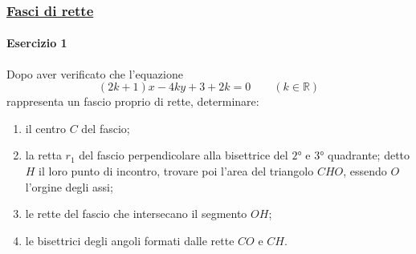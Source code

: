 \subsubsection*{\hyperref[subsec:geomanal:fasciorette]{Fasci di rette}}
\paragraph{Esercizio 1}
Dopo aver verificato che l'equazione
\begin{equation*}
  (2k+1)x -4ky + 3 + 2k = 0 \qquad (k\in\mathbb{R})
\end{equation*}
rappresenta un fascio proprio di rette, determinare:
\begin{enumerate}
  \item il centro $C$ del fascio; \label{enum:ex:retta:2:1}
  \item la retta $r_1$ del fascio perpendicolare alla bisettrice del $\ang{2}$ e $\ang{3}$ quadrante;
    detto $H$ il loro punto di incontro, trovare poi l'area del triangolo $CHO$, essendo $O$ l'orgine
    degli assi;\label{enum:ex:retta:2:2}
  \item le rette del fascio che intersecano il segmento $OH$;\label{enum:ex:retta:2:3}
  \item le bisettrici degli angoli formati dalle rette $CO$ e $CH$.\label{enum:ex:retta:2:4}
\end{enumerate}
\divisor


